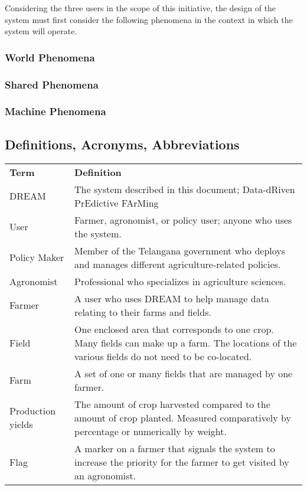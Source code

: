 \begin{flushleft} 
Considering the three users in the scope of this initiative, the design of the system must first consider the following phenomena in the context in which the system will operate.  

\subsubsection{World Phenomena}

\subsubsection{Shared Phenomena}

\subsubsection{Machine Phenomena}

\end{flushleft}

\subsection{Definitions, Acronyms, Abbreviations}


\begin{center}
\renewcommand{\arraystretch}{1.25}
\begin{tabular}{l >{\raggedright\arraybackslash}p{12cm} } \hline
    \textbf{Term} & \textbf{Definition}\\ 
    DREAM & The system described in this document; Data-dRiven PrEdictive FArMing\\
    User & Farmer, agronomist, or policy user; anyone who uses the system.\\

	Policy Maker & Member of the Telangana government who deploys and manages different agriculture-related policies. \\
	Agronomist & Professional who specializes in agriculture sciences. \\
    Farmer & A user who uses DREAM to help manage data relating to their farms and fields.\\
    Field & One enclosed area that corresponds to one crop. Many fields can make up a farm. The locations of the various fields do not need to be co-located.\\
    Farm & A set of one or many fields that are managed by one farmer.\\
    Production yields & The amount of crop harvested compared to the amount of crop planted. Measured comparatively by percentage or numerically by weight.\\
    Flag & A marker on a farmer that signals the system to increase the priority for the farmer to get visited by an agronomist.\\
    \hline
\end{tabular}
\end{center}

